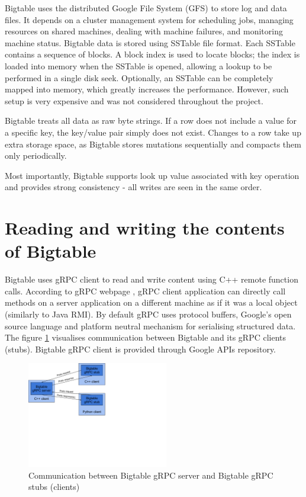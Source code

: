 \documentclass[bsc,frontabs,twoside,singlespacing,parskip,deptreport]{infthesis}     %
\begin{document}
Bigtable uses the distributed Google File System (GFS) to store log and data files. It depends on a cluster management system for scheduling jobs, managing resources on shared machines, dealing with machine failures, and monitoring machine status. Bigtable data is stored using SSTable file format. Each SSTable contains a sequence of blocks. A block index is used to locate blocks; the index is loaded into memory when the SSTable is opened, allowing a lookup to be performed in a single disk seek. Optionally, an SSTable can be completely mapped into memory, which greatly increases the performance. However, such setup is very expensive and was not considered throughout the project.

Bigtable treats all data as raw byte strings. If a row does not include a value for a specific key, the key/value pair simply does not exist. Changes to a row take up extra storage space, as Bigtable stores mutations sequentially and compacts them only periodically.

Most importantly, Bigtable supports look up value associated with key operation and provides strong consistency - all writes are seen in the same order.

\section{Reading and writing the contents of Bigtable}

Bigtable uses gRPC client to read and write content using C++ remote function calls. According to gRPC webpage \citep{grpc}, gRPC client application can directly call methods on a server application on a different machine as if it was a local object (similarly to Java RMI). By default gRPC uses protocol buffers, Google's open source language and platform neutral mechanism for serialising structured data. The figure \ref{fig:grpc} visualises communication between Bigtable and its gRPC clients (stubs). Bigtable gRPC client is provided through Google APIs repository. 

\begin{figure}[H]
\centering
\includegraphics[width=0.55\textwidth]{images/grpc1}
\caption{Communication between Bigtable gRPC server and Bigtable gRPC stubs (clients)}
\label{fig:grpc}
\end{figure}
\end{document}
